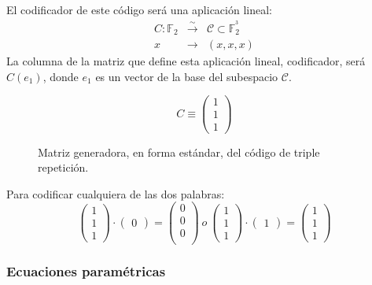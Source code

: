 El codificador de este c\'odigo ser\'a una aplicaci\'on lineal:
\begin{eqnarray*}
C:\mathbb{F}_2&\stackrel{\sim}\longrightarrow&\mathcal{C}\subset \mathbb{
F}^{^3}_2\\
x&\longrightarrow&(x,x,x)
\end{eqnarray*}
La columna de la matriz que define esta aplicaci\'on lineal, codificador,
ser\'a
$C(e_1)$, donde $e_1$ es un vector de la base del subespacio $\mathcal{C}$.\\

\begin{figure}[!h]
\begin{displaymath}
C\equiv \left( \begin{array}{c}
1\\
1\\
1
\end{array} \right)
\end{displaymath}
\caption{Matriz generadora, en forma est\'andar, del c\'odigo de triple
repetici\'on.}
\end{figure}
%
Para codificar cualquiera de las dos palabras:
\begin{displaymath}
\left( \begin{array}{c}
1\\
1\\
1
\end{array} \right) \cdot
\left( \begin{array}{c}
0
\end{array} \right) =
\left( \begin{array}{c}
0\\
0\\
0\\
\end{array} \right) \ o \
\left( \begin{array}{c}
1\\
1\\
1
\end{array} \right) \cdot
\left( \begin{array}{c}
1
\end{array} \right) =
\left( \begin{array}{c}
1\\
1\\
1
\end{array} \right)
\end{displaymath}

\subsubsection{Ecuaciones param\'etricas}

